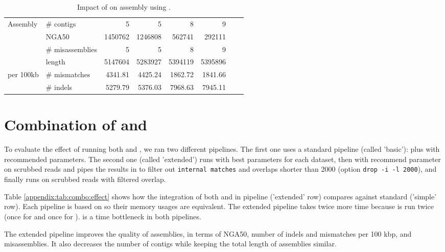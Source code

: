 \documentclass[../../main.tex]{subfiles}
\begin{document}
\begin{table}[ht]
\begin{tabular}{ll|rr|rr|rr|}
 Assembly  &  \# contigs  & 5 & 5 & 8 &  9 &  & \\
  &  NGA50  & 1450762 & 1246808 & 562741 &  292111 &  & \\
  &  \# misassemblies  & 5 & 5 & 8 &  9 &  & \\
  &  length  & 5147604 & 5283927 & 5394119 &  5395896 &  & \\ \hline
per 100kb  &  \# mismatches  & 4341.81 & 4425.24 & 1862.72 &  1841.66 &  & \\
  &  \# indels  & 5279.79 & 5376.03 & 7968.63 &  7945.11 &  & \\
    \end{tabular}
    \caption{Impact of \fpa on assembly using \miniasm.}
    \label{appendix:tab:fpa:effect}
\end{table}



\newpage
\section{Combination of \yacrd and \fpa}\label{appendix:sec:combo}

To evaluate the effect of running both \yacrd and \fpa, we ran two different pipelines. The first one uses a  standard \miniasm pipeline (called 'basic'): \minimap plus \miniasm with recommended parameters. The second one (called 'extended') runs \yacrd with best parameters for each dataset, then \minimap with recommend parameter on scrubbed reads and pipes the results in \fpa to filter out \texttt{internal matches} and overlaps shorter than 2000 (option \texttt{drop -i -l 2000}), and finally runs \miniasm on scrubbed reads with filtered overlap. 

Table \ref{appendix:tab:combo:effect} shows how the integration of both \yacrd and \fpa in \miniasm pipeline ('extended' row) compares against standard \miniasm ('simple' row). Each pipeline is based on \minimap so their memory usages are equivalent. The extended pipeline takes twice more time because \minimap is run twice (once for \yacrd and once for \miniasm). \minimap is a time bottleneck in both pipelines. 

The extended pipeline improves the quality of assemblies, in terms of NGA50, number of indels and mismatches per 100 kbp, and misassemblies. It also decreases the number of contigs while keeping the total length of assemblies similar.
\end{document}
